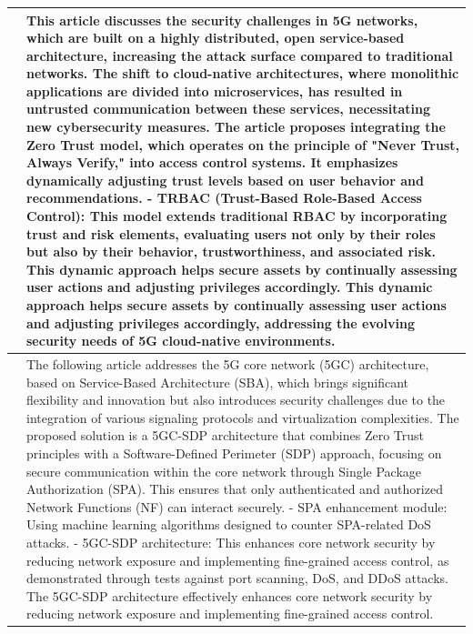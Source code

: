 \documentclass{report}
\begin{document}
\begin{longtable}{|p{4cm}|p{12cm}|}
    \cite{secure5gandbeyond} & This article discusses the security challenges in 5G networks, which are built on a highly distributed, open service-based architecture, increasing the attack surface compared to traditional networks. The shift to cloud-native architectures, where monolithic applications are divided into microservices, has resulted in untrusted communication between these services, necessitating new cybersecurity measures. The article proposes integrating the Zero Trust model, which operates on the principle of "Never Trust, Always Verify," into access control systems. It emphasizes dynamically adjusting trust levels based on user behavior and recommendations. 
    - \textbf{TRBAC (Trust-Based Role-Based Access Control):} This model extends traditional RBAC by incorporating trust and risk elements, evaluating users not only by their roles but also by their behavior, trustworthiness, and associated risk. This dynamic approach helps secure assets by continually assessing user actions and adjusting privileges accordingly.  
    This dynamic approach helps secure assets by continually assessing user actions and adjusting privileges accordingly, addressing the evolving security needs of 5G cloud-native environments. \\ 
    \hline

    \cite{5gcsdp} & The following article addresses the 5G core network (5GC) architecture, based on Service-Based Architecture (SBA), which brings significant flexibility and innovation but also introduces security challenges due to the integration of various signaling protocols and virtualization complexities. The proposed solution is a 5GC-SDP architecture that combines Zero Trust principles with a Software-Defined Perimeter (SDP) approach, focusing on secure communication within the core network through Single Package Authorization (SPA). This ensures that only authenticated and authorized Network Functions (NF) can interact securely.  
    - SPA enhancement module: Using machine learning algorithms designed to counter SPA-related DoS attacks. 
    - 5GC-SDP architecture: This enhances core network security by reducing network exposure and implementing fine-grained access control, as demonstrated through tests against port scanning, DoS, and DDoS attacks.  
    The 5GC-SDP architecture effectively enhances core network security by reducing network exposure and implementing fine-grained access control. \\ 
    \hline
    
\end{longtable}
\end{document}
